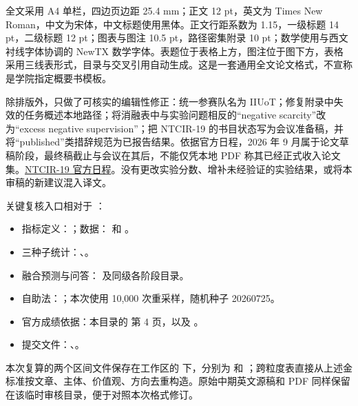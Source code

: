 \documentclass[12pt,a4paper]{article}
\begin{document}
全文采用 A4 单栏，四边页边距 25.4 mm；正文 12 pt，英文为 Times New Roman，中文为宋体，中文标题使用黑体。正文行距系数为 1.15，一级标题 14 pt，二级标题 12 pt；图表与图注 10.5 pt，路径密集附录 10 pt；数学使用与西文衬线字体协调的 NewTX 数学字体。表题位于表格上方，图注位于图下方，表格采用三线表形式，目录与交叉引用自动生成。这是一套通用全文论文格式，不宣称是学院指定概要书模板。

除排版外，只做了可核实的编辑性修正：统一参赛队名为 IIUoT；修复附录中失效的任务概述本地路径；将消融表中与实验问题相反的“negative scarcity”改为“excess negative supervision”；把 NTCIR-19 的书目状态写为会议准备稿，并将“published”类措辞规范为已报告结果。依据官方日程，2026 年 9 月属于论文草稿阶段，最终稿截止与会议在其后，不能仅凭本地 PDF 称其已经正式收入论文集。\href{https://research.nii.ac.jp/ntcir/ntcir-19/index.html}{NTCIR-19 官方日程}。没有更改实验分数、增补未经验证的实验结果，或将本审稿的新建议混入译文。

关键复核入口相对于 ：
\begin{itemize}
\item 指标定义：；数据： 和 。
\item 三种子统计：、。
\item 融合预测与问答： 及同级各阶段目录。
\item 自助法：；本次使用 10,000 次重采样，随机种子 20260725。
\item 官方成绩依据：本目录的  第 4 页，以及 。
\item 提交文件：、。
\end{itemize}
本次复算的两个区间文件保存在工作区的  下，分别为  和 ；跨粒度表直接从上述金标准按文章、主体、价值观、方向去重构造。原始中期英文源稿和 PDF 同样保留在该临时审核目录，便于对照本次格式修订。
\end{document}
